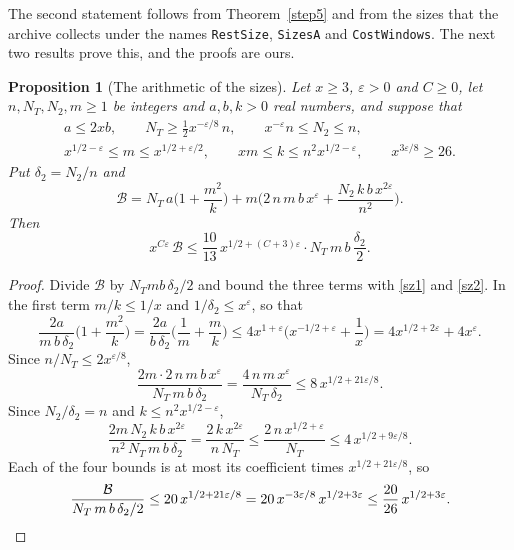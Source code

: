 \documentclass[11pt,letterpaper]{article}
\newtheorem{proposition}[theorem]{Proposition}
\numberwithin{equation}{section}
\begin{document}
The second statement follows from Theorem~\ref{step5} and from the sizes that the archive collects under the names \texttt{RestSize}, \texttt{SizesA} and \texttt{CostWindows}. The next two results prove this, and the proofs are ours.

\begin{proposition}[The arithmetic of the sizes]\label{sizes}
Let $x\ge3$, $\varepsilon>0$ and $C\ge0$, let $n,N_T,N_2,m\ge1$ be integers and $a,b,k>0$ real numbers, and suppose that
\begin{gather}
a\le2xb,\qquad N_T\ge\tfrac12x^{-\varepsilon/8}\,n,\qquad x^{-\varepsilon}n\le N_2\le n,\label{sz1}\\
x^{1/2-\varepsilon}\le m\le x^{1/2+\varepsilon/2},\qquad xm\le k\le n^2x^{1/2-\varepsilon},\qquad x^{3\varepsilon/8}\ge26.\label{sz2}
\end{gather}
Put $\delta_2=N_2/n$ and
\[
\mathcal B=N_T\,a\Big(1+\frac{m^2}k\Big)+m\Big(2\,n\,m\,b\,x^{\varepsilon}+\frac{N_2\,k\,b\,x^{2\varepsilon}}{n^2}\Big).
\]
Then
\[
x^{C\varepsilon}\,\mathcal B\le\frac{10}{13}\,x^{1/2+(C+3)\varepsilon}\cdot N_T\,m\,b\,\frac{\delta_2}2 .
\]
\end{proposition}
\begin{proof}
Divide $\mathcal B$ by $N_Tmb\,\delta_2/2$ and bound the three terms with \eqref{sz1} and \eqref{sz2}. In the first term $m/k\le1/x$ and $1/\delta_2\le x^{\varepsilon}$, so that
\[
\frac{2a}{m\,b\,\delta_2}\Big(1+\frac{m^2}k\Big)=\frac{2a}{b\,\delta_2}\Big(\frac1m+\frac mk\Big)\le4x^{1+\varepsilon}\Big(x^{-1/2+\varepsilon}+\frac1x\Big)=4x^{1/2+2\varepsilon}+4x^{\varepsilon}.
\]
Since $n/N_T\le2x^{\varepsilon/8}$,
\[
\frac{2m\cdot2\,n\,m\,b\,x^{\varepsilon}}{N_T\,m\,b\,\delta_2}=\frac{4\,n\,m\,x^{\varepsilon}}{N_T\,\delta_2}\le8\,x^{1/2+21\varepsilon/8}.
\]
Since $N_2/\delta_2=n$ and $k\le n^2x^{1/2-\varepsilon}$,
\[
\frac{2m\,N_2\,k\,b\,x^{2\varepsilon}}{n^2\,N_T\,m\,b\,\delta_2}=\frac{2\,k\,x^{2\varepsilon}}{n\,N_T}\le\frac{2\,n\,x^{1/2+\varepsilon}}{N_T}\le4\,x^{1/2+9\varepsilon/8}.
\]
Each of the four bounds is at most its coefficient times $x^{1/2+21\varepsilon/8}$, so
\[
\frac{\mathcal B}{N_T\,m\,b\,\delta_2/2}\le20\,x^{1/2+21\varepsilon/8}=20\,x^{-3\varepsilon/8}\,x^{1/2+3\varepsilon}\le\frac{20}{26}\,x^{1/2+3\varepsilon}.\qedhere
\]
\end{proof}
\end{document}
